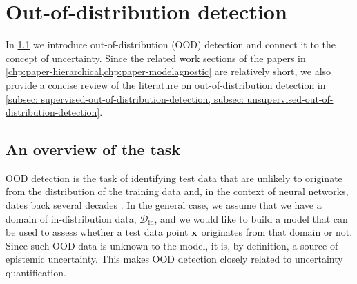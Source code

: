 \section{Out-of-distribution detection} \label{sec:out-of-distribution-detection}
% 
%
%
In \cref{subsec: overview-of-out-of-distribution-detection} we introduce out-of-distribution (OOD) detection and connect it to the concept of uncertainty. 
Since the related work sections of the papers in \cref{chp:paper-hierarchical,chp:paper-modelagnostic} are relatively short, we also provide a concise review of the literature on out-of-distribution detection in \cref{subsec: supervised-out-of-distribution-detection, subsec: unsupervised-out-of-distribution-detection}. 


\subsection{An overview of the task}\label{subsec: overview-of-out-of-distribution-detection}
%
OOD detection is the task of identifying test data that are unlikely to originate from the distribution of the training data and, in the context of neural networks, dates back several decades \parencite{bishop_novelty_1994, chang_figure_1993}.
In the general case, we assume that we have a domain of in-distribution data, $\mathcal{D}_{\text{in}}$, and we would like to build a model that can be used to assess whether a test data point ${\mathbf{x}}$ originates from that domain or not. 
Since such OOD data is unknown to the model, it is, by definition, a source of epistemic uncertainty. This makes OOD detection closely related to uncertainty quantification. 

